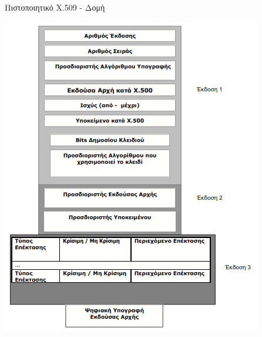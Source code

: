 \documentclass[handout]{beamer}
\begin{document}
\begin{frame}{Πιστοποιητικό X.509 - Δομή}
    \begin{center}
    \includegraphics[scale=0.5]{x509.PNG}
    \end{center} 
\end{frame}
\end{document}
